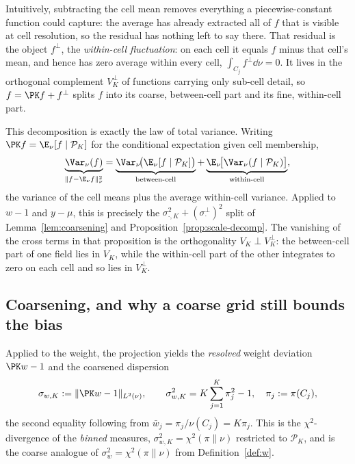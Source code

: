 Intuitively, subtracting the cell mean removes everything a
piecewise-constant function could capture: the average has already
extracted all of $f$ that is visible at cell resolution, so the residual
has nothing left to say there. That residual is the object $f^{\perp}$,
the \emph{within-cell fluctuation}: on each cell it equals $f$ minus
that cell's mean, and hence has zero average within every cell,
$\int_{C_j}f^{\perp}\dd\nu=0$. It lives in the orthogonal complement
$V_K^{\perp}$ of functions carrying only sub-cell detail, so
$f=\PK f+f^{\perp}$ splits $f$ into its coarse, between-cell part and its
fine, within-cell part.

This decomposition is exactly the law of total variance. Writing
$\PK f=\E_\nu[f\mid\mathcal{P}_K]$ for the conditional expectation given
cell membership,
\[
  \underbrace{\Var_\nu(f)}_{\|f-\E_\nu f\|_\nu^2}
  =\underbrace{\Var_\nu\!\big(\E_\nu[f\mid\mathcal{P}_K]\big)}_{\text{between-cell}}
  +\underbrace{\E_\nu\!\big[\Var_\nu(f\mid\mathcal{P}_K)\big]}_{\text{within-cell}},
\]
the variance of the cell means plus the average within-cell variance.
Applied to $w-1$ and $y-\mu$, this is precisely the
$\sigma_{\cdot,K}^2+(\sigma_\cdot^{\perp})^2$ split of
Lemma~\ref{lem:coarsening} and Proposition~\ref{prop:scale-decomp}. The
vanishing of the cross terms in that proposition is the orthogonality
$V_K\perp V_K^{\perp}$: the between-cell part of one field lies in
$V_K$, while the within-cell part of the other integrates to zero on
each cell and so lies in $V_K^{\perp}$.

\subsection{Coarsening, and why a coarse grid still bounds the bias}
\label{sec:coarsening}

Applied to the weight, the projection yields the \emph{resolved} weight
deviation $\PK w-1$ and the coarsened dispersion
\begin{equation}
  \sigma_{w,K}:=\|\PK w-1\|_{L^2(\nu)},\qquad
  \sigma_{w,K}^2=K\sum_{j=1}^{K}\pi_j^2-1,\quad \pi_j:=\pi(C_j),
  \label{eq:sigmawK-def}
\end{equation}
the second equality following from $\bar w_j=\pi_j/\nu(C_j)=K\pi_j$.
This is the $\chi^2$-divergence of the \emph{binned} measures,
$\sigma_{w,K}^2=\chi^2(\pi\|\nu)$ restricted to $\mathcal{P}_K$, and is
the coarse analogue of $\sigma_w^2=\chi^2(\pi\|\nu)$ from
Definition~\ref{def:w}.

